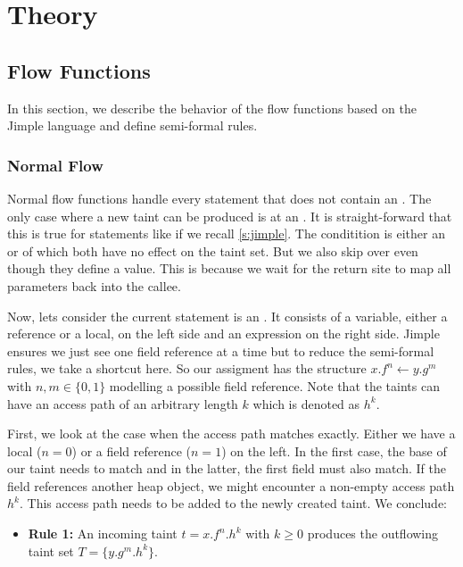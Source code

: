 \documentclass[../draft.tex]{subfiles}
\begin{document}
    \chapter{Theory}
    \section{Flow Functions}
    In this section, we describe the behavior of the flow functions based on the Jimple language and define semi-formal rules.

    \subsection{Normal Flow}
    Normal flow functions handle every statement that does not contain an . The only case where a new taint can be produced is at an . It is straight-forward that this is true for statements like  if we recall \autoref{s:jimple}. The conditition is either an  or  of which both have no effect on the taint set. But we also skip over  even though they define a value. This is because we wait for the return site to map all parameters back into the callee.

    Now, lets consider the current statement is an . It consists of a variable, either a reference or a local, on the left side and an expression on the right side. Jimple ensures we just see one field reference at a time but to reduce the semi-formal rules, we take a shortcut here. So our assigment has the structure $x.f^n \leftarrow y.g^m$ with $n,m \in \{0,1\}$ modelling a possible field reference. Note that the taints can have an access path of an arbitrary length $k$ which is denoted as $h^k$.

    First, we look at the case when the access path matches exactly. Either we have a local ($n=0$) or a field reference ($n=1$) on the left. In the first case, the base of our taint needs to match and in the latter, the first field must also match. If the field references another heap object, we might encounter a non-empty access path $h^k$. This access path needs to be added to the newly created taint. We conclude:
    \begin{itemize}
        \item[] \textbf{Rule 1:} An incoming taint $t = x.f^n.h^k$ with $k \geq 0$ produces the outflowing taint set $T = \{y.g^m.h^k\}$.
    \end{itemize} 
\end{document}
